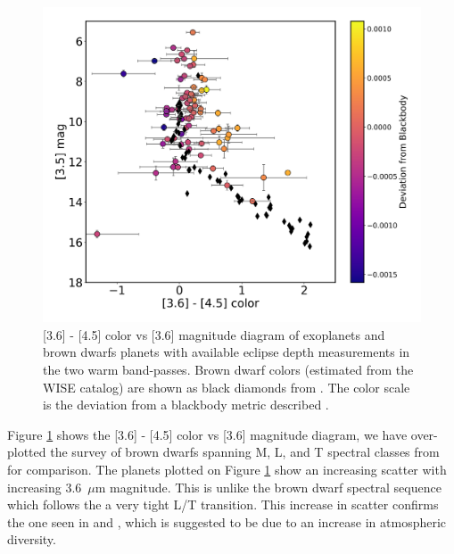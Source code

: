 \begin{figure}
    \centering
    \includegraphics[width = \linewidth]{color+bd+emily.pdf}
    \caption{[3.6] - [4.5] color vs [3.6] magnitude diagram of exoplanets and brown dwarfs planets with available eclipse depth measurements in the two warm \spitzer band-passes. Brown dwarf colors (estimated from the WISE catalog) are shown as black diamonds from \citet{Dupuy2012}. The color scale is the deviation from a blackbody metric described \citet{Baxter2020}.}
    \label{P1:fig:colourmag}
\end{figure}

Figure \ref{P1:fig:colourmag} shows the [3.6] - [4.5] color vs [3.6] magnitude diagram, we have over-plotted the survey of brown dwarfs spanning M, L, and T spectral classes from \citet{Dupuy2012} for comparison. The planets plotted on Figure \ref{P1:fig:colourmag} show an increasing scatter with increasing 3.6~$\mu$m magnitude. This is unlike the brown dwarf spectral sequence which follows the a very tight L/T transition. This increase in scatter confirms the one seen in \citet{Triaud2014c, Beatty2014, Melville2020} and \citet{Dransfield2020}, which is suggested to be due to an increase in atmospheric diversity.

